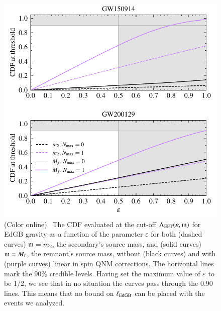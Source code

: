 \documentclass[twocolumn,
               prd,
               aps,
               superscriptaddress,
               tightenlines,
               nofootinbib,
               eqsecnum,
               amsfonts,
               amsmath,
               longbibliography]{revtex4-1}
\newcommand{\gm}{\mathfrak{m}}
\begin{document}
\begin{figure}[h]
\includegraphics[width=\columnwidth]{figs/edgb_cdf_varying_threshold.pdf}
\caption{(Color online).~The CDF evaluated at the
cut-off $\Lambda_{\rm EFT}(\varepsilon,\gm)$ for EdGB gravity as a function of the parameter
$\varepsilon$ for both (dashed curves) $\gm = m_2$, the secondary's source
mass, and (solid curves) $\gm = M_{\rm f}$, the remnant's source mass, without
(black curves) and with (purple curves) linear in spin QNM corrections. The
horizontal lines mark the $90\%$ credible levels. Having set the maximum value
of $\varepsilon$ to be 1/2, we see that in no situation the curves pass
through the 0.90 lines. This means that no bound on $\ell_{\rm EdGB}$ can be placed
with the events we analyzed.
}
\label{fig:edgb_cdf}
\end{figure}
\end{document}
